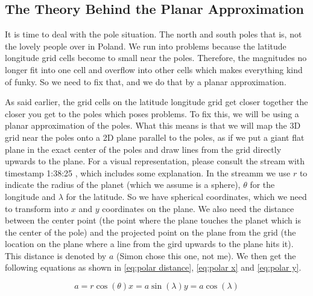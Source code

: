 \subsection{The Theory Behind the Planar Approximation}
It is time to deal with the pole situation. The north and south poles that is, not the lovely people over in Poland. We run into problems because the latitude longitude grid cells become to small 
near the poles. Therefore, the magnitudes no longer fit into one cell and overflow into other cells which makes everything kind of funky. So we need to fix that, and we do that by a planar 
approximation. 

As said earlier, the grid cells on the latitude longitude grid get closer together the closer you get to the poles which poses problems. To fix this, we will be using a planar approximation of 
the poles. What this means is that we will map the 3D grid near the poles onto a 2D plane parallel to the poles, as if we put a giant flat plane in the exact center of the poles and draw lines
from the grid directly upwards to the plane. For a visual representation, please consult the stream with timestamp 1:38:25 \cite{polarPlane}, which includes some explanation. In the streamm we
use $r$ to indicate the radius of the planet (which we assume is a sphere), $\theta$ for the longitude and $\lambda$ for the latitude. So we have spherical coordinates, which we need to transform
into $x$ and $y$ coordinates on the plane. We also need the distance between the center point (the point where the plane touches the planet which is the center of the pole) and the projected 
point on the plane from the grid (the location on the plane where a line from the gird upwards to the plane hits it). This distance is denoted by $a$ (Simon chose this one, not me). We then get 
the following equations as shown in \autoref{eq:polar distance}, \autoref{eq:polar x} and \autoref{eq:polar y}. 

\begin{subequations}
    \begin{equation}
        a = r \cos(\theta)
        \label{eq:polar distance}
    \end{equation}
    \begin{equation}
        x = a \sin(\lambda)
        \label{eq:polar x}
    \end{equation}
    \begin{equation}
        y = a \cos(\lambda)
        \label{eq:polar y}
    \end{equation}
\end{subequations}

